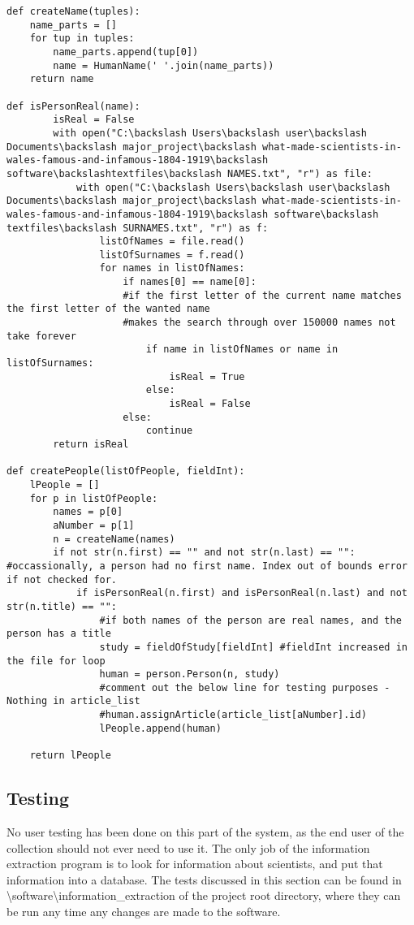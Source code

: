 \documentclass[11pt,a4paper]{book}
\begin{document}
\begin{lstlisting}[caption={Creating People}]
def createName(tuples):
	name_parts = []
	for tup in tuples:
		name_parts.append(tup[0])
		name = HumanName(' '.join(name_parts))
	return name
	
def isPersonReal(name):
		isReal = False
		with open("C:\backslash Users\backslash user\backslash Documents\backslash major_project\backslash what-made-scientists-in-wales-famous-and-infamous-1804-1919\backslash software\backslashtextfiles\backslash NAMES.txt", "r") as file:
			with open("C:\backslash Users\backslash user\backslash Documents\backslash major_project\backslash what-made-scientists-in-wales-famous-and-infamous-1804-1919\backslash software\backslash textfiles\backslash SURNAMES.txt", "r") as f:
				listOfNames = file.read()
				listOfSurnames = f.read()
				for names in listOfNames:
					if names[0] == name[0]:
					#if the first letter of the current name matches the first letter of the wanted name
					#makes the search through over 150000 names not take forever
						if name in listOfNames or name in listOfSurnames:
							isReal = True
						else:
							isReal = False
					else:
						continue
		return isReal
		
def createPeople(listOfPeople, fieldInt):
	lPeople = []
	for p in listOfPeople:
		names = p[0]
		aNumber = p[1]
		n = createName(names)
		if not str(n.first) == "" and not str(n.last) == "": #occassionally, a person had no first name. Index out of bounds error if not checked for.
			if isPersonReal(n.first) and isPersonReal(n.last) and not str(n.title) == "": 
				#if both names of the person are real names, and the person has a title
				study = fieldOfStudy[fieldInt] #fieldInt increased in the file for loop
				human = person.Person(n, study)
				#comment out the below line for testing purposes - Nothing in article_list
				#human.assignArticle(article_list[aNumber].id)
				lPeople.append(human)
		
	return lPeople
\end{lstlisting}

\subsection{Testing}
No user testing has been done on this part of the system, as the end user of the collection should not ever need to use it. The only job of the information extraction program is to look for information about scientists, and put that information into a database. The tests discussed in this section can be found in \textbackslash software\textbackslash information\_extraction of the project root directory, where they can be run any time any changes are made to the software. 
\end{document}
